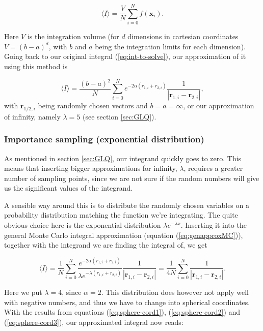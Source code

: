 \documentclass[../main.tex]{subfiles}
\begin{document}
\begin{equation}
  \langle I\rangle = \frac{V}{N}\sum_{i=0}^Nf(\mathbf x_i).
\end{equation}

Here $V$ is the integration volume (for $d$ dimensions in cartesian coordinates $V=(b-a)^d$, with $b$ and $a$ being the integration limits for each dimension). Going back to our original integral (\ref{eq:int-to-solve}), our approximation of it using this method is

\begin{equation}
  \langle I \rangle = \frac{(b-a)^2}{N}\sum_{i=0}^Ne^{-2\alpha(r_{1,i}+r_{2,i})}\frac{1}{|\mathbf r_{1,i}-\mathbf r_{2,i}|},
  \label{eq:naive-approx}
\end{equation}
with $\mathbf r_{1/2,i}$ being randomly chosen vectors and $b=a=\infty$, or our approximation of infinity, namely $\lambda = 5$ (see section \ref{sec:GLQ}).

\subsubsection{Importance sampling (exponential distribution)} \label{sec:improvedMC}

As mentioned in section \ref{sec:GLQ}, our integrand quickly goes to zero. This means that inserting bigger approximations for infinity, $\lambda$, requires a greater number of sampling points, since we are not sure if the random numbers will give us the significant values of the integrand.

A sensible way around this is to distribute the randomly chosen variables on a probability distribution matching the function we're integrating. The quite obvious choice here is the exponential distribution $\lambda e^{-\lambda x}$. Inserting it into the general Monte Carlo integral approximation (equation (\ref{eq:genapproxMC})), together with the integrand we are finding the integral of, we get

\begin{equation*}
  \langle I \rangle =\frac{1}{N}\sum_{i=0}^N\frac{e^{-2\alpha(r_{1,i}+r_{2,i})}}{\lambda e^{-\lambda(r_{1,i}+r_{2,i})}}\frac{1}{|\mathbf r_{1,i}-\mathbf r_{2,i}|}=\frac{1}{4N}\sum_{i=0}^N\frac{1}{|\mathbf r_{1,i} - \mathbf r_{2,i}|}.
\end{equation*}

Here we put $\lambda=4$, since $\alpha=2$. This distribution does however not apply well with negative numbers, and thus we have to change into spherical coordinates. With the results from equations (\ref{eq:sphere-cord1}), (\ref{eq:sphere-cord2}) and (\ref{eq:sphere-cord3}), our approximated integral now reads:
\end{document}
